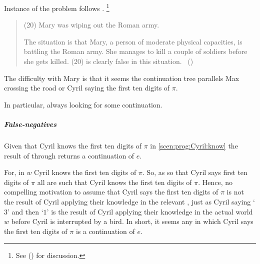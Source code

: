\begin{note}
  Instance of the problem follows \citeauthor{Landman:1992wh}.%
  \footnote{
    See \citeauthor{Landman:1992wh} (\citeyear[\S2.3]{Landman:1992wh}) for discussion.
  }

  \begin{quote}
    (20) Mary was wiping out the Roman army.

    The situation is that Mary, a person of moderate physical capacities, is battling the Roman army. She manages to kill a couple of soldiers before she gets killed.
    (20) is clearly false in this situation.%
    \mbox{ }\hfill\mbox{(\citeyear[18]{Landman:1992wh})}
  \end{quote}

  The difficulty with Mary is that it seems the continuation tree parallels Max crossing the road or Cyril saying the first ten digits of \(\pi\).

  In particular, always looking for some continuation.
\end{note}


\subparagraph*{False-negatives}

\begin{note}
  Given that Cyril knows the first ten digits of \(\pi\) in \autoref{scen:prog:Cyril:know} the result of \drifting{} through  returns a continuation of \(e\).

  For, in \(w\) Cyril knows the first ten digits of \(\pi\).
  So, as \drift{} so that Cyril says first ten digits of \(\pi\) all  are such that Cyril knows the first ten digits of \(\pi\).
  Hence, no compelling motivation to assume that Cyril says the first ten digits of \(\pi\) is not the result of Cyril applying their knowledge in the relevant , just as Cyril saying `\(3\)' and then `\(1\)' is the result of Cyril applying their knowledge in the actual world \(w\) before Cyril is interrupted by a bird.
  In short, it seems any  in which Cyril says the first ten digits of \(\pi\) is a continuation of \(e\).
\end{note}

